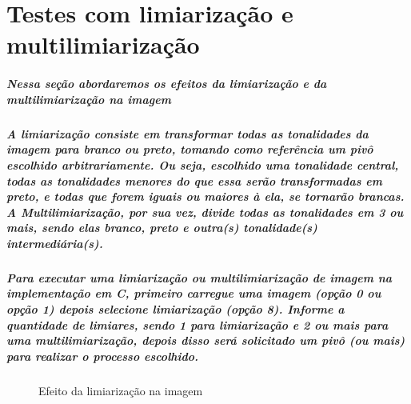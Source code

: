 \documentclass[12pt,fleqn]{article}
\begin{document}
\section{Testes com limiarização e multilimiarização}
  \subparagraph{\normalfont Nessa seção abordaremos os efeitos da limiarização e da multilimiarização na imagem}
  \subparagraph{\normalfont A limiarização consiste em transformar todas as tonalidades da imagem para branco ou preto, tomando como referência um pivô escolhido arbitrariamente. 
  Ou seja, escolhido uma tonalidade central, todas as tonalidades menores do que essa serão transformadas em preto, e todas que forem iguais ou maiores à ela, se tornarão brancas.
  A Multilimiarização, por sua vez, divide todas as tonalidades em 3 ou mais, sendo elas branco, preto e outra(s) tonalidade(s) intermediária(s).
  }

  \newpage

  \subparagraph{\normalfont Para executar uma limiarização ou multilimiarização de imagem na implementação em C, primeiro carregue uma imagem (opção 0 ou opção 1) 
  depois selecione limiarização (opção 8). Informe a quantidade de limiares, sendo 1 para limiarização e 2 ou mais para uma multilimiarização, depois disso será
  solicitado um pivô (ou mais) para realizar o processo escolhido.}

  \begin{figure}[!htb]
  \centering
  \caption{Efeito da limiarização na imagem}
  \label{fig:Resultado 1}
  \end{figure}
\end{document}
